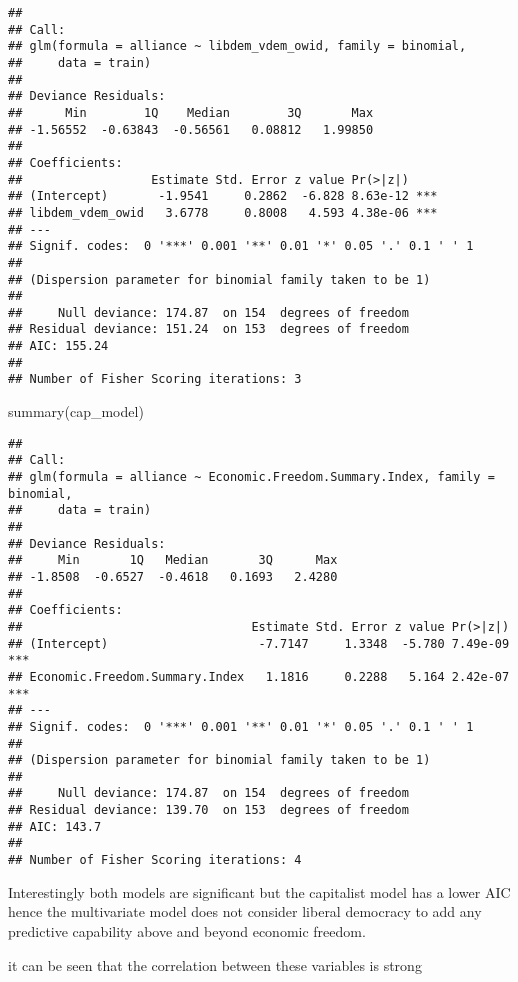 \documentclass[
]{article}
\newenvironment{Shaded}{\begin{snugshade}}{\end{snugshade}}
\newcommand{\FunctionTok}[1]{\textcolor[rgb]{0.00,0.00,0.00}{#1}}
\newcommand{\NormalTok}[1]{#1}
\newcommand{\SpecialCharTok}[1]{\textcolor[rgb]{0.00,0.00,0.00}{#1}}
\begin{document}
\begin{verbatim}
## 
## Call:
## glm(formula = alliance ~ libdem_vdem_owid, family = binomial, 
##     data = train)
## 
## Deviance Residuals: 
##      Min        1Q    Median        3Q       Max  
## -1.56552  -0.63843  -0.56561   0.08812   1.99850  
## 
## Coefficients:
##                  Estimate Std. Error z value Pr(>|z|)    
## (Intercept)       -1.9541     0.2862  -6.828 8.63e-12 ***
## libdem_vdem_owid   3.6778     0.8008   4.593 4.38e-06 ***
## ---
## Signif. codes:  0 '***' 0.001 '**' 0.01 '*' 0.05 '.' 0.1 ' ' 1
## 
## (Dispersion parameter for binomial family taken to be 1)
## 
##     Null deviance: 174.87  on 154  degrees of freedom
## Residual deviance: 151.24  on 153  degrees of freedom
## AIC: 155.24
## 
## Number of Fisher Scoring iterations: 3
\end{verbatim}

\begin{Shaded}
\begin{Highlighting}[]
\FunctionTok{summary}\NormalTok{(cap\_model)}
\end{Highlighting}
\end{Shaded}

\begin{verbatim}
## 
## Call:
## glm(formula = alliance ~ Economic.Freedom.Summary.Index, family = binomial, 
##     data = train)
## 
## Deviance Residuals: 
##     Min       1Q   Median       3Q      Max  
## -1.8508  -0.6527  -0.4618   0.1693   2.4280  
## 
## Coefficients:
##                                Estimate Std. Error z value Pr(>|z|)    
## (Intercept)                     -7.7147     1.3348  -5.780 7.49e-09 ***
## Economic.Freedom.Summary.Index   1.1816     0.2288   5.164 2.42e-07 ***
## ---
## Signif. codes:  0 '***' 0.001 '**' 0.01 '*' 0.05 '.' 0.1 ' ' 1
## 
## (Dispersion parameter for binomial family taken to be 1)
## 
##     Null deviance: 174.87  on 154  degrees of freedom
## Residual deviance: 139.70  on 153  degrees of freedom
## AIC: 143.7
## 
## Number of Fisher Scoring iterations: 4
\end{verbatim}

Interestingly both models are significant but the capitalist model has a
lower AIC hence the multivariate model does not consider liberal
democracy to add any predictive capability above and beyond economic
freedom.

it can be seen that the correlation between these variables is strong

\begin{Shaded}
\end{Shaded}
\end{document}
